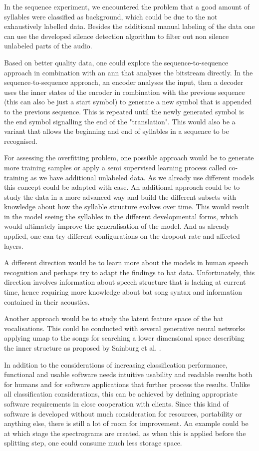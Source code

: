 In the sequence experiment, we encountered the problem that a good amount of syllables were classified as background, which could be due to the not exhaustively labelled data.
Besides the additional manual labeling of the data one can use the developed silence detection algorithm to filter out non silence unlabeled parts of the audio.

Based on better quality data, one could explore the sequence-to-sequence approach in combination with an \gls{ann} that analyses the bitstream directly. In the sequence-to-sequence approach, an encoder analyses the input, then a decoder uses the inner states of the encoder in combination with the previous sequence (this can also be just a start symbol) to generate a new symbol that is appended to the previous sequence. This is repeated until the newly generated symbol is the end symbol signalling the end of the "translation".
This would also be a variant that allows the beginning and end of syllables in a sequence to be recognised.

For assessing the overfitting problem, one possible approach would be to generate more training samples or apply a semi supervised learning process called co-training as we have additional unlabeled data.
As we already use different models this concept could be adapted with ease.
An additional approach could be to study the data in a more advanced way and build the different subsets with knowledge about how the syllable structure evolves over time.
This would result in the model seeing the syllables in the different developmental forms, which would ultimately improve the generalisation of the model.
And as already applied, one can try different configurations on the dropout rate and affected layers.

A different direction would be to learn more about the models in human speech recognition and perhaps try to adapt the findings to bat data. Unfortunately, this direction involves information about speech structure that is lacking at current time, hence requiring more knowledge about bat song syntax and information contained in their acoustics.

Another approach would be to study the latent feature space of the bat vocalisations. This could be conducted with several generative neural networks applying \gls{umap} to the songs for searching a lower dimensional space describing the inner structure as proposed by Sainburg et al. \cite{Sainburg2020}.

In addition to the considerations of increasing classification performance, functional and usable software needs intuitive usability and readable results both for humans and for software applications that further process the results. Unlike all classification considerations, this can be achieved by defining appropriate software requirements in close cooperation with clients.
Since this kind of software is developed without much consideration for resources, portability or anything else, there is still a lot of room for improvement.
An example could be at which stage the spectrograms are created, as when this is applied before the splitting step, one could consume much less storage space.

